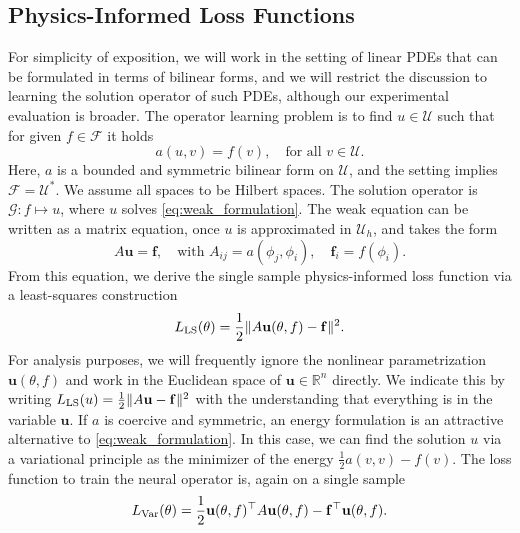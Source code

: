 \documentclass{article} %
\begin{document}
\subsection{Physics-Informed Loss Functions}
For simplicity of exposition, we will work in the setting of linear PDEs that can be formulated in terms of bilinear forms, and we will restrict the discussion to learning the solution operator of such PDEs, although our experimental evaluation is broader. The operator learning problem is to find $u\in\mathcal U$ such that for given $f\in\mathcal F$ it holds
\begin{equation}\label{eq:weak_formulation}
   a(u,v) = f(v), \quad \text{for all }v\in\mathcal U.
\end{equation}
Here, $a$ is a bounded and symmetric bilinear form on $\mathcal U$, and the setting implies $\mathcal F=\mathcal U^*$. We assume all spaces to be Hilbert spaces. The solution operator is $\mathcal G:f\mapsto u$, where $u$ solves \eqref{eq:weak_formulation}. The weak equation can be written as a matrix equation, once $u$ is approximated in $\mathcal U_h$, and takes the form
\begin{equation*}
   A\mathbf u = \mathbf f, \quad \text{with }A_{ij} = a(\phi_j, \phi_i), \quad \mathbf f_i=f(\phi_i).
\end{equation*}
From this equation, we derive the single sample physics-informed loss function via a least-squares construction
\begin{equation}\label{eq:LS_loss_in_theta}
   L_{\textup{LS}}(\theta) = \frac12 \| A \mathbf u(\theta, f) - \mathbf f \|^2.
\end{equation}
For analysis purposes, we will frequently ignore the nonlinear parametrization $\mathbf u(\theta, f)$ and work in the Euclidean space of $\mathbf u\in\mathbb R^n$ directly. We indicate this by writing $L_{\textup{LS}}(u) = \frac 12 \| A\mathbf u - \mathbf f \|^2$ with the understanding that everything is in the variable $\mathbf u$.
If $a$ is coercive and symmetric, an energy formulation is an attractive alternative to \eqref{eq:weak_formulation}. In this case, we can find the solution $u$ via a variational principle as the minimizer of the energy $\tfrac12 a(v,v)-f(v)$. The loss function to train the neural operator is, again on a single sample
\begin{equation}\label{eq:variational_loss_in_theta}
   L_{\textup{Var}}(\theta)= \frac12 \mathbf u(\theta, f)^\top A \mathbf u(\theta, f) - \mathbf f^\top \mathbf u(\theta, f).
\end{equation}
\end{document}
